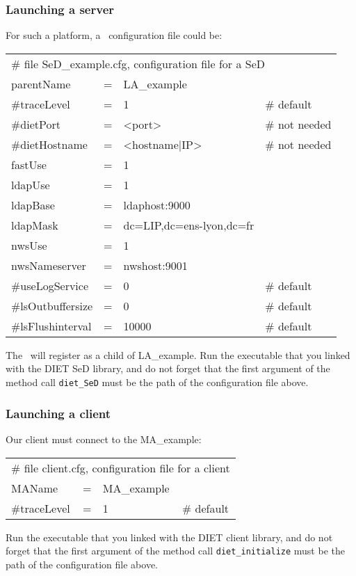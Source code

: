 \subsubsection{Launching a server}

For such a platform, a \sed\ configuration file could be:
\tt
\begin{center}
 \footnotesize
 \begin{tabular}{lcll}
  \multicolumn{4}{l}{\# file SeD\_example.cfg, configuration file for a SeD}\\
  parentName   &=&LA\_example        &\\
  \#traceLevel &=&1                 &\# default\\
  \#dietPort    &=&<port>             &\# not needed\\
  \#dietHostname&=&<hostname|IP>      &\# not needed\\
  fastUse    &=&1                 &\\
  ldapUse    &=&1                 &\\
  ldapBase     &=&ldaphost:9000     &\\
  ldapMask     &=&dc=LIP,dc=ens-lyon,dc=fr&\\
  nwsUse     &=&1                 &\\
  nwsNameserver&=&nwshost:9001      &\\
  \#useLogService &=& 0               &\# default\\
  \#lsOutbuffersize &=& 0             &\# default\\
  \#lsFlushinterval &=& 10000           &\# default\\
 \end{tabular}
\end{center}
\rm

The \sed\ will register as a child of LA\_example. Run the executable
that you linked with the DIET SeD library, and do not forget that the
first argument of the method call \texttt{diet\_SeD} must be the path of the
configuration file above.


\subsubsection{Launching a client}

Our client must connect to the MA\_example:
\tt
\begin{center}
 \footnotesize
 \begin{tabular}{lcll}
  \multicolumn{4}{l}{\# file client.cfg, configuration file for a client}\\
  MAName       &=&MA\_example        &\\
  \#traceLevel &=&1                 &\# default\\
 \end{tabular}
\end{center}
\rm

Run the executable that you linked with the DIET client library, and
do not forget that the first argument of the method call
\texttt{diet\_initialize} must be the path of the configuration
file above.
